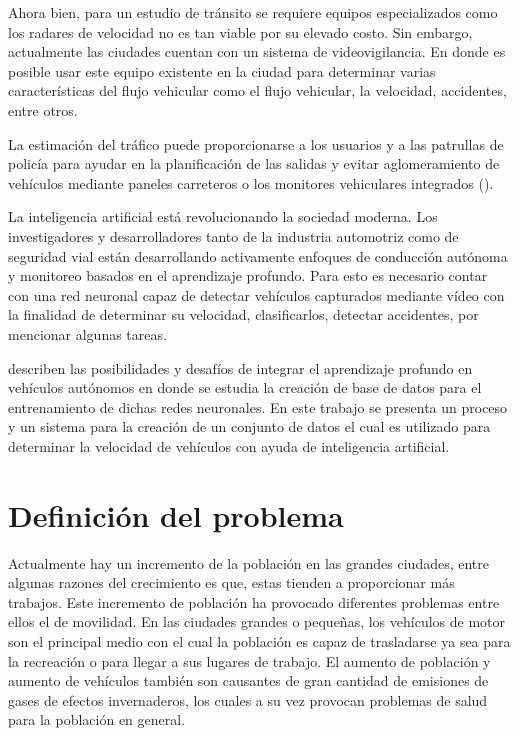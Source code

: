 Ahora bien, para un estudio de tránsito se requiere equipos especializados como los radares de velocidad no es tan viable por su elevado costo. Sin embargo, actualmente las ciudades cuentan con un sistema de videovigilancia. En donde es posible usar este equipo existente en la ciudad para determinar varias características del flujo vehicular como el flujo vehicular, la velocidad, accidentes, entre otros.

La estimación del tráfico puede proporcionarse a los usuarios y a las patrullas de policía para ayudar en la planificación de las salidas y evitar aglomeramiento de vehículos mediante paneles carreteros o los monitores vehiculares integrados (\cite{impedovo2019Vehicular}).

La inteligencia artificial está revolucionando la sociedad moderna. Los investigadores y desarrolladores tanto de la industria automotriz como de seguridad vial están desarrollando activamente enfoques de conducción autónoma y monitoreo basados en el aprendizaje profundo. Para esto es necesario contar con una red neuronal capaz de detectar vehículos capturados mediante vídeo con la finalidad de determinar su velocidad, clasificarlos, detectar accidentes, por mencionar algunas tareas.

\citeauthor{rao2018Deep} describen las posibilidades y desafíos de integrar el aprendizaje profundo en vehículos autónomos en donde se estudia la creación de base de datos para el entrenamiento de dichas redes neuronales. En este trabajo se presenta un proceso y un sistema para la creación de un conjunto de datos el cual es utilizado para  determinar la velocidad de vehículos con ayuda de inteligencia artificial.



\section{Definición del problema}

Actualmente hay un incremento de la población en las grandes ciudades, entre algunas razones del crecimiento es que, estas tienden a proporcionar más trabajos. Este incremento de población ha provocado diferentes problemas entre ellos el de movilidad. En las ciudades grandes o pequeñas, los vehículos de motor son el principal medio con el cual la población es capaz de trasladarse ya sea para la recreación o para llegar a sus lugares de trabajo. El aumento de población y aumento de vehículos también son causantes de gran cantidad de emisiones de gases de efectos invernaderos, los cuales a su vez provocan problemas de salud para la población en general.

